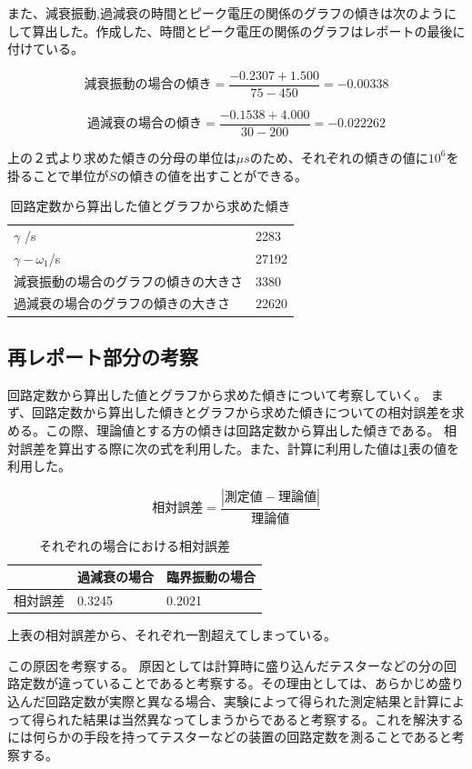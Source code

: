 \documentclass{jsarticle}
\begin{document}
また、減衰振動,過減衰の時間とピーク電圧の関係のグラフの傾きは次のようにして算出した。作成した、時間とピーク電圧の関係のグラフはレポートの最後に付けている。

\begin{equation}
    減衰振動の場合の傾き = \frac{-0.2307+1.500}{75-450} = -0.00338
\end{equation}

\begin{equation}
    過減衰の場合の傾き = \frac{-0.1538+4.000}{30-200} = -0.022262
\end{equation}

上の２式より求めた傾きの分母の単位は$\mu s$のため、それぞれの傾きの値に$10^6$を掛ることで単位が$S$の傾きの値を出すことができる。

\begin{table}[H]
\centering
\caption{回路定数から算出した値とグラフから求めた傾き}
\label{kairaoteisuukarasanshutusita}
\begin{tabular}{|l|l|}
$\gamma$ /s        & 2283     \\
$\gamma - \omega_1$/s & 27192    \\
減衰振動の場合のグラフの傾きの大きさ    & 3380 \\
過減衰の場合のグラフの傾きの大きさ     & 22620
\end{tabular}
\end{table}

\subsection{再レポート部分の考察}

回路定数から算出した値とグラフから求めた傾きについて考察していく。
まず、回路定数から算出した傾きとグラフから求めた傾きについての相対誤差を求める。この際、理論値とする方の傾きは回路定数から算出した傾きである。
相対誤差を算出する際に次の式を利用した。また、計算に利用した値は\ref{kairaoteisuukarasanshutusita}表の値を利用した。

\begin{equation}
    \label{soutaigosa}
    相対誤差 = \frac{|測定値-理論値|}{理論値}
\end{equation}

\begin{table}[H]
    \centering
    \caption{それぞれの場合における相対誤差}
    \label{my-label}
    \begin{tabular}{|l|l|l|}
    \hline
         & 過減衰の場合 & 臨界振動の場合 \\ \hline
    相対誤差 & 0.3245 & 0.2021  \\ \hline
    \end{tabular}
    \end{table}

上表の相対誤差から、それぞれ一割超えてしまっている。

この原因を考察する。
原因としては計算時に盛り込んだテスターなどの分の回路定数が違っていることであると考察する。その理由としては、あらかじめ盛り込んだ回路定数が実際と異なる場合、実験によって得られた測定結果と計算によって得られた結果は当然異なってしまうからであると考察する。これを解決するには何らかの手段を持ってテスターなどの装置の回路定数を測ることであると考察する。
\end{document}
